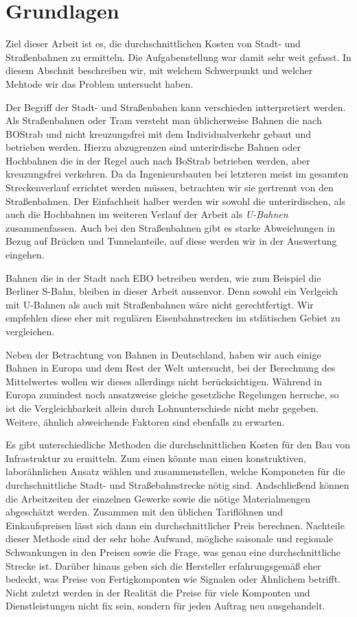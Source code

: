 \chapter{Grundlagen}

Ziel dieser Arbeit ist es, die durchschnittlichen Kosten von Stadt- und
Straßenbahnen zu ermitteln. Die Aufgabenstellung war damit sehr weit gefasst. In
diesem Abschnit beschreiben wir, mit welchem Schwerpunkt und welcher Mehtode wir
das Problem untersucht haben.

Der Begriff der Stadt- und Straßenbahen kann verschieden intterpretiert
werden. Als Straßenbahnen oder Tram versteht man üblicherweise Bahnen die nach
BOStrab \cite{bostrab} und nicht kreuzungsfrei mit dem Individualverkehr gebaut
und betrieben werden. Hierzu abzugrenzen sind unterirdische Bahnen oder
Hochbahnen die in der Regel auch nach BoStrab betrieben werden, aber
kreuzungsfrei verkehren. Da da Ingenieursbauten bei letzteren meist im gesamten
Streckenverlauf errichtet werden müssen, betrachten wir sie gertrennt von den
Straßenbahnen. Der Einfachheit halber werden wir sowohl die unterirdischen, als
auch die Hochbahnen im weiteren Verlauf der Arbeit als \emph{U-Bahnen}
zusammenfassen. Auch bei den Straßenbahnen gibt es starke Abweichungen in Bezug
auf Brücken und Tunnelanteile, auf diese werden wir in der Auswertung eingehen.

Bahnen die in der Stadt nach EBO \cite{ebo} betreiben werden, wie zum Beispiel
die Berliner S-Bahn, bleiben in dieser Arbeit aussenvor. Denn sowohl ein
Verlgeich mit U-Bahnen als auch mit Straßenbahnen wäre nicht gerechtfertigt. Wir
empfehlen diese eher mit regulären Eisenbahnstrecken im stdätischen Gebiet zu
vergleichen.

Neben der Betrachtung von Bahnen in Deutschland, haben wir auch einige Bahnen in
Europa und dem Rest der Welt untersucht, bei der Berechnung des Mittelwertes
wollen wir dieses allerdings nicht berücksichtigen. Während in Europa zumindest noch
ansatzweise gleiche gesetzliche Regelungen herrsche, so ist die
Vergleichbarkeit allein durch Lohnunterschiede nicht mehr gegeben. Weitere,
ähnlich abweichende Faktoren sind ebenfalls zu erwarten.

Es gibt unterschiedliche Methoden die durchschnittlichen Kosten für den Bau von
Infrastruktur zu ermitteln. Zum einen könnte man einen konstruktiven,
laborähnlichen Ansatz wählen und zusammenstellen, welche Komponeten für die
durchschnittliche Stadt- und Straßebahnstrecke nötig sind. Andschließend können
die Arbeitzeiten der einzelnen Gewerke sowie die nötige Materialmengen
abgeschätzt werden. Zusammen mit den üblichen Tariflöhnen und Einkaufspreisen
lässt sich dann ein durchschnittlicher Preis berechnen. Nachteile dieser Methode
sind der sehr hohe Aufwand, mögliche saisonale und regionale Schwankungen in den
Preisen sowie die Frage, was genau eine durchschnittliche Strecke ist. Darüber
hinaus geben sich die Hersteller erfahrungsgemäß eher bedeckt, was Preise von
Fertigkomponten wie Signalen oder Ähnlichem betrifft. Nicht zuletzt werden in
der Realität die Preise für viele Komponten und Dienstleistungen nicht fix sein,
sondern für jeden Auftrag neu ausgehandelt.

